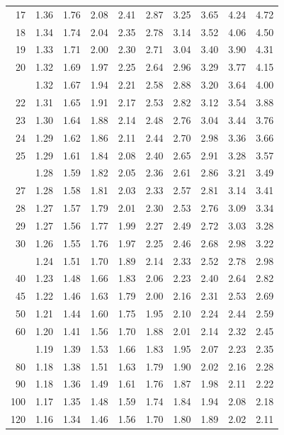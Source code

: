 \documentclass[10pt]{article}
\begin{document}
\begin{longtable}{@{}r!{\vrule width 0.8pt\hspace{0.55em}}rrrrrrrrr@{}}
17 & 1.36 & 1.76 & 2.08 & 2.41 & 2.87 & 3.25 & 3.65 & 4.24 & 4.72 \\
18 & 1.34 & 1.74 & 2.04 & 2.35 & 2.78 & 3.14 & 3.52 & 4.06 & 4.50 \\
19 & 1.33 & 1.71 & 2.00 & 2.30 & 2.71 & 3.04 & 3.40 & 3.90 & 4.31 \\
20 & 1.32 & 1.69 & 1.97 & 2.25 & 2.64 & 2.96 & 3.29 & 3.77 & 4.15 \\
 & 1.32 & 1.67 & 1.94 & 2.21 & 2.58 & 2.88 & 3.20 & 3.64 & 4.00 \\
22 & 1.31 & 1.65 & 1.91 & 2.17 & 2.53 & 2.82 & 3.12 & 3.54 & 3.88 \\
23 & 1.30 & 1.64 & 1.88 & 2.14 & 2.48 & 2.76 & 3.04 & 3.44 & 3.76 \\
24 & 1.29 & 1.62 & 1.86 & 2.11 & 2.44 & 2.70 & 2.98 & 3.36 & 3.66 \\
25 & 1.29 & 1.61 & 1.84 & 2.08 & 2.40 & 2.65 & 2.91 & 3.28 & 3.57 \\
 & 1.28 & 1.59 & 1.82 & 2.05 & 2.36 & 2.61 & 2.86 & 3.21 & 3.49 \\
27 & 1.28 & 1.58 & 1.81 & 2.03 & 2.33 & 2.57 & 2.81 & 3.14 & 3.41 \\
28 & 1.27 & 1.57 & 1.79 & 2.01 & 2.30 & 2.53 & 2.76 & 3.09 & 3.34 \\
29 & 1.27 & 1.56 & 1.77 & 1.99 & 2.27 & 2.49 & 2.72 & 3.03 & 3.28 \\
30 & 1.26 & 1.55 & 1.76 & 1.97 & 2.25 & 2.46 & 2.68 & 2.98 & 3.22 \\
 & 1.24 & 1.51 & 1.70 & 1.89 & 2.14 & 2.33 & 2.52 & 2.78 & 2.98 \\
40 & 1.23 & 1.48 & 1.66 & 1.83 & 2.06 & 2.23 & 2.40 & 2.64 & 2.82 \\
45 & 1.22 & 1.46 & 1.63 & 1.79 & 2.00 & 2.16 & 2.31 & 2.53 & 2.69 \\
50 & 1.21 & 1.44 & 1.60 & 1.75 & 1.95 & 2.10 & 2.24 & 2.44 & 2.59 \\
60 & 1.20 & 1.41 & 1.56 & 1.70 & 1.88 & 2.01 & 2.14 & 2.32 & 2.45 \\
 & 1.19 & 1.39 & 1.53 & 1.66 & 1.83 & 1.95 & 2.07 & 2.23 & 2.35 \\
80 & 1.18 & 1.38 & 1.51 & 1.63 & 1.79 & 1.90 & 2.02 & 2.16 & 2.28 \\
90 & 1.18 & 1.36 & 1.49 & 1.61 & 1.76 & 1.87 & 1.98 & 2.11 & 2.22 \\
100 & 1.17 & 1.35 & 1.48 & 1.59 & 1.74 & 1.84 & 1.94 & 2.08 & 2.18 \\
120 & 1.16 & 1.34 & 1.46 & 1.56 & 1.70 & 1.80 & 1.89 & 2.02 & 2.11 \\

\end{longtable}
\end{document}
